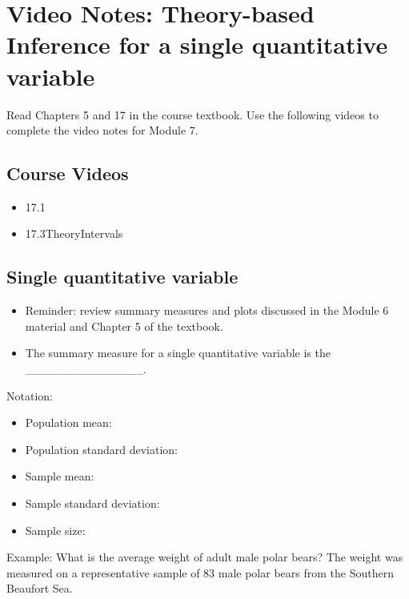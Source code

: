 \documentclass[
]{report}
\begin{document}
\newpage

\section{Video Notes: Theory-based Inference for a single quantitative variable}\label{video-notes-theory-based-inference-for-a-single-quantitative-variable}

Read Chapters 5 and 17 in the course textbook. Use the following videos to complete the video notes for Module 7.

\subsection{Course Videos}\label{course-videos-5}

\begin{itemize}
\item
  17.1
\item
  17.3TheoryIntervals
\end{itemize}


\subsection{Single quantitative variable}\label{single-quantitative-variable}

\begin{itemize}
\item
  Reminder: review summary measures and plots discussed in the Module 6 material and Chapter 5 of the textbook.
\item
  The summary measure for a single quantitative variable is the \_\_\_\_\_\_\_\_\_\_\_\_\_\_.
\end{itemize}


Notation:

\begin{itemize}
\item
  Population mean:
\item
  Population standard deviation:
\item
  Sample mean:
\item
  Sample standard deviation:
\item
  Sample size:
\end{itemize}


Example: What is the average weight of adult male polar bears? The weight was measured on a representative sample of 83 male polar bears from the Southern Beaufort Sea.
\end{document}
